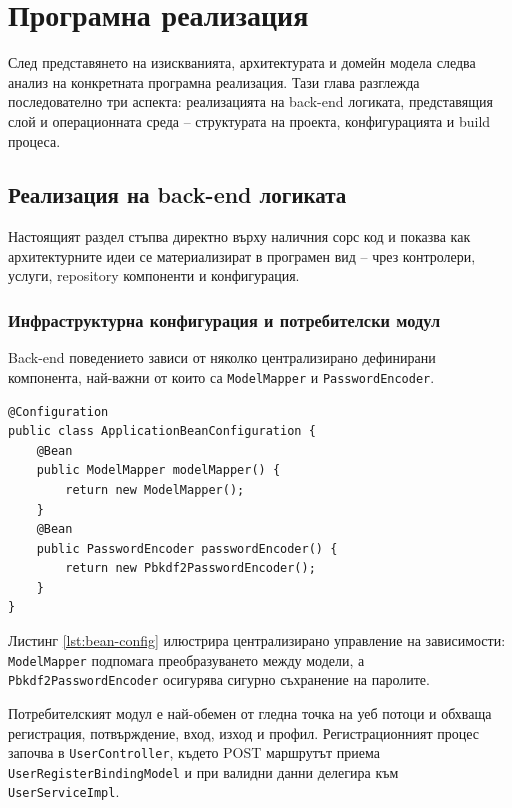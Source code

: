 \section{Програмна реализация}

След представянето на изискванията, архитектурата и домейн модела следва анализ на конкретната програмна реализация. Тази глава разглежда последователно три аспекта: реализацията на back-end логиката, представящия слой и операционната среда -- структурата на проекта, конфигурацията и build процеса.

\subsection{Реализация на back-end логиката}

Настоящият раздел стъпва директно върху наличния сорс код и показва как архитектурните идеи се материализират в програмен вид -- чрез контролери, услуги, repository компоненти и конфигурация.

\subsubsection{Инфраструктурна конфигурация и потребителски модул}

Back-end поведението зависи от няколко централизирано дефинирани компонента, най-важни от които са \texttt{ModelMapper} и \texttt{PasswordEncoder}.

\begin{lstlisting}[caption={Конфигурация на mapper и password encoder},label={lst:bean-config}]
@Configuration
public class ApplicationBeanConfiguration {
    @Bean
    public ModelMapper modelMapper() {
        return new ModelMapper();
    }
    @Bean
    public PasswordEncoder passwordEncoder() {
        return new Pbkdf2PasswordEncoder();
    }
}
\end{lstlisting}

Листинг \ref{lst:bean-config} илюстрира централизирано управление на зависимости: \texttt{ModelMapper} подпомага преобразуването между модели, а \texttt{Pbkdf2PasswordEncoder} осигурява сигурно съхранение на паролите.

Потребителският модул е най-обемен от гледна точка на уеб потоци и обхваща регистрация, потвърждение, вход, изход и профил. Регистрационният процес започва в \texttt{UserController}, където POST маршрутът приема \texttt{UserRegisterBindingModel} и при валидни данни делегира към \texttt{UserServiceImpl}.

